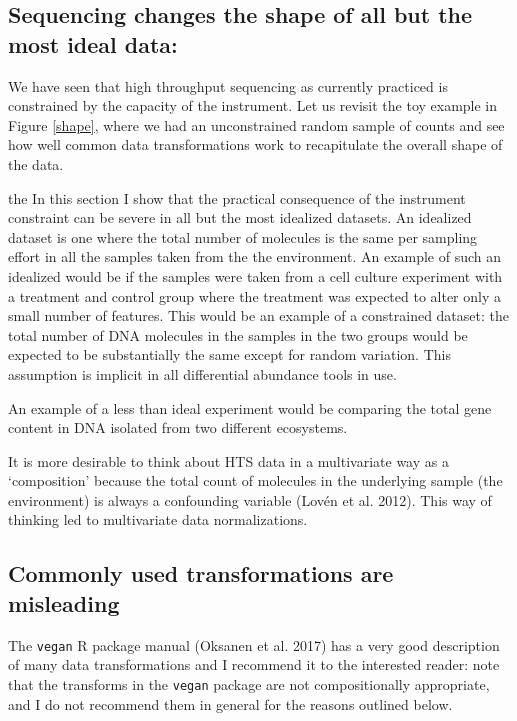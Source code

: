 \documentclass[onecolumn]{article}
\begin{document}
\hypertarget{sequencing-changes-the-shape-of-all-but-the-most-ideal-data}{%
\subsection{Sequencing changes the shape of all but the most ideal data:}\label{sequencing-changes-the-shape-of-all-but-the-most-ideal-data}}

We have seen that high throughput sequencing as currently practiced is constrained by the capacity of the instrument. Let us revisit the toy example in Figure \ref{shape}, where we had an unconstrained random sample of counts and see how well common data transformations work to recapitulate the overall shape of the data.

the In this section I show that the practical consequence of the instrument constraint can be severe in all but the most idealized datasets. An idealized dataset is one where the total number of molecules is the same per sampling effort in all the samples taken from the the environment. An example of such an idealized would be if the samples were taken from a cell culture experiment with a treatment and control group where the treatment was expected to alter only a small number of features. This would be an example of a constrained dataset: the total number of DNA molecules in the samples in the two groups would be expected to be substantially the same except for random variation. This assumption is implicit in all differential abundance tools in use.

An example of a less than ideal experiment would be comparing the total gene content in DNA isolated from two different ecosystems.

It is more desirable to think about HTS data in a multivariate way as a `composition' because the total count of molecules in the underlying sample (the environment) is always a confounding variable (Lovén et al. 2012). This way of thinking led to multivariate data normalizations.

\hypertarget{commonly-used-transformations-are-misleading}{%
\subsection{Commonly used transformations are misleading}\label{commonly-used-transformations-are-misleading}}

The \texttt{vegan} R package manual (Oksanen et al. 2017) has a very good description of many data transformations and I recommend it to the interested reader: note that the transforms in the \texttt{vegan} package are not compositionally appropriate, and I do not recommend them in general for the reasons outlined below.
\end{document}

